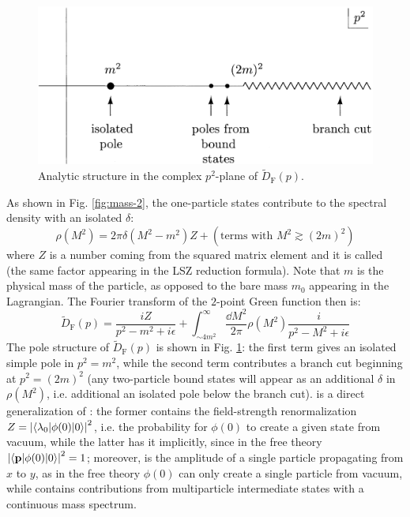 \begin{figure}[!ht]
  \centering
  \includegraphics[width = 0.60 \textwidth]{images/poles.png}
  \caption{Analytic structure in the complex $ p^2 $-plane of $ \tilde{D}_\text{F}(p) $.}
  \label{fig:mass-3}
\end{figure}

As shown in Fig. \ref{fig:mass-2}, the one-particle states contribute to the spectral density with an isolated $ \delta $:
\begin{equation}
  \rho(M^2) = 2\pi \delta(M^2 - m^2) Z + (\text{terms with } M^2 \gtrsim (2m)^2)
\end{equation}
where $ Z $ is a number coming from the squared matrix element and it is called  (the same factor appearing in the LSZ reduction formula). Note that $ m $ is the physical mass of the particle, as opposed to the bare mass $ m_0 $ appearing in the Lagrangian. The Fourier transform of the $ 2 $-point Green function then is:
\begin{equation}
  \tilde{D}_\text{F}(p) = \frac{i Z}{p^2 - m^2 + i\epsilon} + \int_{\sim 4m^2}^\infty \frac{\dd M^2}{2\pi} \rho(M^2) \frac{i}{p^2 - M^2 + i\epsilon}
  \label{eq:corr-func-gen}
\end{equation}
The pole structure of $ \tilde{D}_\text{F}(p) $ is shown in Fig. \ref{fig:mass-3}: the first term gives an isolated simple pole in $ p^2 = m^2 $, while the second term contributes a branch cut beginning at $ p^2 = (2m)^2 $ (any two-particle bound states will appear as an additional $ \delta $ in $ \rho(M^2) $, i.e. additional an isolated pole below the branch cut).  is a direct generalization of : the former contains the field-strength renormalization $ Z = \left\lvert\braket{\lambda_0 | \phi(0) | 0}\right\rvert^2 $, i.e. the probability for $ \phi(0) $ to create a given state from vacuum, while the latter has it implicitly, since in the free theory $ \left\lvert\braket{\mathbf{p} | \phi(0) | 0}\right\rvert^2 = 1 $; moreover,  is the amplitude of a single particle propagating from $ x $ to $ y $, as in the free theory $ \phi(0) $ can only create a single particle from vacuum, while  contains contributions from multiparticle intermediate states with a continuous mass spectrum.

